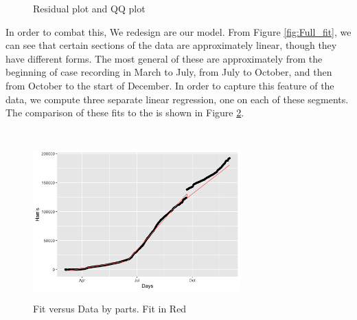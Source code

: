 \documentclass{article}
\begin{document}
\begin{figure}[H]
\centering
{}
\caption{Residual plot and QQ plot}
\label{fig:QQ_Res}
\end{figure}
In order to combat this, We redesign are our model. From Figure  \ref{fig:Full_fit}, we can see that certain sections of the data are approximately linear, though they have different forms. The most general of these are approximately from the beginning of case recording in March to July, from July to October, and then from October to the start of December. In order to capture this feature of the data, we compute three separate linear regression, one on each of these segments. The comparison of these fits to the is shown in Figure \ref{fig:Part_fit}.\\\\
\begin{figure}[H]
    \centering
    \includegraphics[width=8cm,height=6cm]{Part_fit.png}
    \caption{Fit versus Data by parts. Fit in Red}
    \label{fig:Part_fit}
\end{figure}
\end{document}
